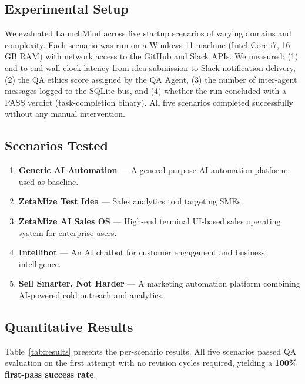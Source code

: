 \documentclass[conference]{IEEEtran}
\begin{document}
\subsection{Experimental Setup}

We evaluated LaunchMind across five startup scenarios of varying domains and complexity. Each scenario was run on a Windows 11 machine (Intel Core i7, 16 GB RAM) with network access to the GitHub and Slack APIs. We measured: (1) end-to-end wall-clock latency from idea submission to Slack notification delivery, (2) the QA ethics score assigned by the QA Agent, (3) the number of inter-agent messages logged to the SQLite bus, and (4) whether the run concluded with a PASS verdict (task-completion binary). All five scenarios completed successfully without any manual intervention.

\subsection{Scenarios Tested}

\begin{enumerate}
    \item \textbf{Generic AI Automation} — A general-purpose AI automation platform; used as baseline.
    \item \textbf{ZetaMize Test Idea} — Sales analytics tool targeting SMEs.
    \item \textbf{ZetaMize AI Sales OS} — High-end terminal UI-based sales operating system for enterprise users.
    \item \textbf{Intellibot} — An AI chatbot for customer engagement and business intelligence.
    \item \textbf{Sell Smarter, Not Harder} — A marketing automation platform combining AI-powered cold outreach and analytics.
\end{enumerate}

\subsection{Quantitative Results}

Table~\ref{tab:results} presents the per-scenario results. All five scenarios passed QA evaluation on the first attempt with no revision cycles required, yielding a \textbf{100\% first-pass success rate}.
\end{document}
